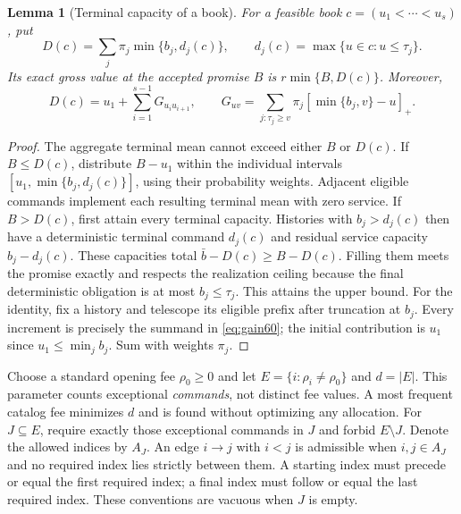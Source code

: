 \documentclass[11pt,letterpaper]{article}
\newtheorem{lemma}[theorem]{Lemma}
\theoremstyle{definition}\newtheorem{remark}[theorem]{Remark}
\begin{document}
\begin{lemma}[Terminal capacity of a book]\label{lem:capacity60}
For a feasible book $c=(u_1<\cdots<u_s)$, put
\[
 D(c)=\sum_j\pi_j\min\{b_j,d_j(c)\},\qquad
 d_j(c)=\max\{u\in c:u\leq\tau_j\}.
\]
Its exact gross value at the accepted promise $B$ is $r\min\{B,D(c)\}$. Moreover,
\begin{equation}\label{eq:gain60}
 D(c)=u_1+\sum_{i=1}^{s-1}G_{u_i u_{i+1}},\qquad
 G_{uv}=\sum_{j:\tau_j\geq v}\pi_j[\min\{b_j,v\}-u]_+.
\end{equation}
\end{lemma}
\begin{proof}
The aggregate terminal mean cannot exceed either $B$ or $D(c)$. If $B\leq D(c)$, distribute $B-u_1$ within the individual intervals $[u_1,\min\{b_j,d_j(c)\}]$, using their probability weights. Adjacent eligible commands implement each resulting terminal mean with zero service. If $B>D(c)$, first attain every terminal capacity. Histories with $b_j>d_j(c)$ then have a deterministic terminal command $d_j(c)$ and residual service capacity $b_j-d_j(c)$. These capacities total $\bar b-D(c)\geq B-D(c)$. Filling them meets the promise exactly and respects the realization ceiling because the final deterministic obligation is at most $b_j\leq\tau_j$. This attains the upper bound. For the identity, fix a history and telescope its eligible prefix after truncation at $b_j$. Every increment is precisely the summand in \eqref{eq:gain60}; the initial contribution is $u_1$ since $u_1\leq\min_j b_j$. Sum with weights $\pi_j$.
\end{proof}

Choose a standard opening fee $\rho_0\geq0$ and let $E=\{i:\rho_i\ne\rho_0\}$ and $d=|E|$. This parameter counts exceptional \emph{commands}, not distinct fee values. A most frequent catalog fee minimizes $d$ and is found without optimizing any allocation. For $J\subseteq E$, require exactly those exceptional commands in $J$ and forbid $E\setminus J$. Denote the allowed indices by $A_J$. An edge $i\to j$ with $i<j$ is admissible when $i,j\in A_J$ and no required index lies strictly between them. A starting index must precede or equal the first required index; a final index must follow or equal the last required index. These conventions are vacuous when $J$ is empty.
\end{document}
